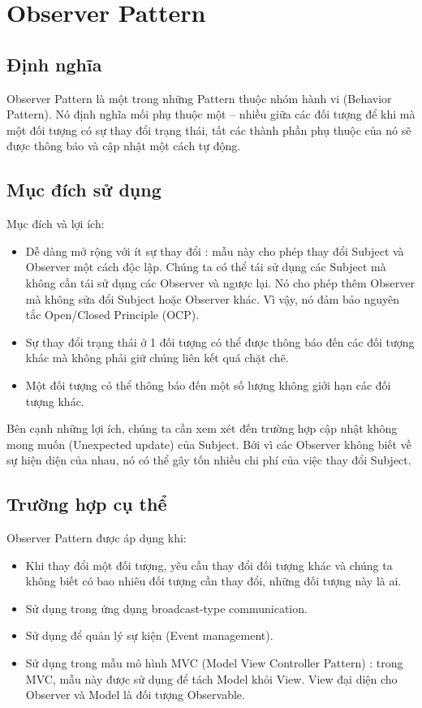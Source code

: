\chapter{Observer Pattern}

\section{Định nghĩa}
Observer Pattern là một trong những Pattern thuộc nhóm hành vi (Behavior Pattern). Nó định nghĩa mối phụ thuộc một – nhiều giữa các đối tượng để khi mà một đối tượng có sự thay đổi trạng thái, tất các thành phần phụ thuộc của nó sẽ được thông báo và cập nhật một cách tự động.

\section{Mục đích sử dụng}
Mục đích và lợi ích:
\begin{itemize}
	\item	Dễ dàng mở rộng với ít sự thay đổi : mẫu này cho phép thay đổi Subject và Observer một cách độc lập. Chúng ta có thể tái sử dụng các Subject mà không cần tái sử dụng các Observer và ngược lại. Nó cho phép thêm Observer mà không sửa đổi Subject hoặc Observer khác. Vì vậy, nó đảm bảo nguyên tắc Open/Closed Principle (OCP).\\
	\item	Sự thay đổi trạng thái ở 1 đối tượng có thể được thông báo đến các đối tượng khác mà không phải giữ chúng liên kết quá chặt chẽ.\\
	\item	Một đối tượng có thể thông báo đến một số lượng không giới hạn các đối tượng khác.
\end{itemize}
Bên cạnh những lợi ích, chúng ta cần xem xét đến trường hợp cập nhật không mong muốn (Unexpected update) của Subject. Bởi vì các Observer không biết về sự hiện diện của nhau, nó có thể gây tốn nhiều chi phí của việc thay đổi Subject.
\section{Trường hợp cụ thể}
Observer Pattern được áp dụng khi:

\begin{itemize}
	\item Khi thay đổi một đối tượng, yêu cầu thay đổi đối tượng khác và chúng ta không biết có bao nhiêu đối tượng cần thay đổi, những đối tượng này là ai.\\
	\item Sử dụng trong ứng dụng broadcast-type communication.\\
	\item Sử dụng để quản lý sự kiện (Event management).\\
	\item Sử dụng trong mẫu mô hình MVC (Model View Controller Pattern) : trong MVC, mẫu này được sử dụng để tách Model khỏi View. View đại diện cho Observer và Model là đối tượng Observable.
\end{itemize}
